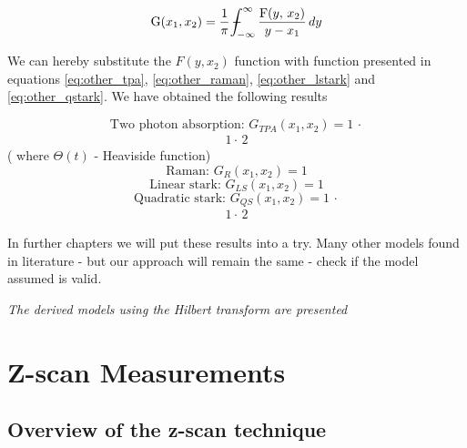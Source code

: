 \documentclass[12pt,twoside,a4paper]{article}
\numberwithin{equation}{subsection}
\numberwithin{figure}{subsection}
\def\Xint#1{\mathchoice
{\XXint\displaystyle\textstyle{#1}}%
{\XXint\textstyle\scriptstyle{#1}}%
{\XXint\scriptstyle\scriptscriptstyle{#1}}%
{\XXint\scriptscriptstyle\scriptscriptstyle{#1}}%
\!\int}
\def\XXint#1#2#3{{\setbox0=\hbox{$#1{#2#3}{\int}$ }\vcenter{\hbox{$#2#3$ }}\kern-.6\wd0}}
\def\dashint{\Xint-}
\begin{document}
\begin{equation} \label{eq:hother_euqation}
  \mathrm{G}(x_1, x_2)=\frac{1}{\pi }\, \dashint_{ - \infty }^{\infty }\frac { \mathrm{F}(y, \,x_2)}{y - x_1}\,dy
\end{equation}

We can hereby substitute the $F(y, x_2)$ function with function presented in equations \ref{eq:other_tpa},
\ref{eq:other_raman}, \ref{eq:other_lstark} and \ref{eq:other_qstark}. We have obtained the following results

\begin{equation} \label{eq:dother_tpa}
  \mbox{Two photon absorption: } {G_{TPA}}(x_1, x_2) = 1\,\cdot
\end{equation}
\begin{alignat*}{1}
  \cdot\,2
\end{alignat*}
( where $\Theta (t)$ - Heaviside function)
\begin{equation} \label{eq:dother_raman}
  \mbox{Raman: } {G_{R}}(x_1, x_2) = 1
\end{equation}
\begin{equation} \label{eq:dother_lstark}
  \mbox{Linear stark: } {G_{LS}}(x_1, x_2) = 1
\end{equation}
\begin{equation} \label{eq:dother_qstark}
  \mbox{Quadratic stark: } {G_{QS}}(x_1, x_2) = 1\,\cdot
\end{equation}
\begin{alignat*}{1}
  \cdot\,2
\end{alignat*}

In further chapters we will put these results into a try. Many other models found in literature - but our approach will remain the
same - check if the model assumed is valid.

\textit{The derived models using the Hilbert transform are presented}

\section{Z-scan Measurements} \label{chap:zscan}

\subsection{Overview of the z-scan technique} \label{chap:zscan_overview}
\end{document}
